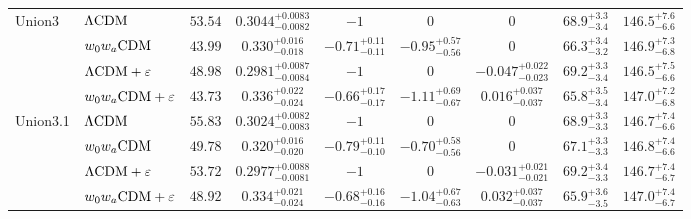\begin{table}[t]
\begin{ruledtabular}
\begin{tabular}{llrcccccc}
Union3 & $\Lambda{\rm CDM}$ & $53.54$ & $0.3044^{+0.0083}_{-0.0082}$ & $-1$ & $0$ & $0$ & $68.9^{+3.3}_{-3.4}$ & $146.5^{+7.6}_{-6.6}$ \\[0.4em]
 & $w_0w_a{\rm CDM}$ & $43.99$ & $0.330^{+0.016}_{-0.018}$ & $-0.71^{+0.11}_{-0.11}$ & $-0.95^{+0.57}_{-0.56}$ & $0$ & $66.3^{+3.4}_{-3.2}$ & $146.9^{+7.3}_{-6.8}$ \\[0.4em]
 & $\Lambda{\rm CDM} + \varepsilon$ & $48.98$ & $0.2981^{+0.0087}_{-0.0084}$ & $-1$ & $0$ & $-0.047^{+0.022}_{-0.023}$ & $69.2^{+3.3}_{-3.4}$ & $146.5^{+7.5}_{-6.6}$ \\[0.4em]
 & $w_0w_a{\rm CDM} + \varepsilon$ & $43.73$ & $0.336^{+0.022}_{-0.024}$ & $-0.66^{+0.17}_{-0.17}$ & $-1.11^{+0.69}_{-0.67}$ & $0.016^{+0.037}_{-0.037}$ & $65.8^{+3.5}_{-3.4}$ & $147.0^{+7.2}_{-6.8}$ \\[0.4em]
\hline\rule{0pt}{1.4em}%
Union3.1 & $\Lambda{\rm CDM}$ & $55.83$ & $0.3024^{+0.0082}_{-0.0083}$ & $-1$ & $0$ & $0$ & $68.9^{+3.3}_{-3.3}$ & $146.7^{+7.4}_{-6.6}$ \\[0.4em]
 & $w_0w_a{\rm CDM}$ & $49.78$ & $0.320^{+0.016}_{-0.020}$ & $-0.79^{+0.11}_{-0.10}$ & $-0.70^{+0.58}_{-0.56}$ & $0$ & $67.1^{+3.3}_{-3.3}$ & $146.8^{+7.4}_{-6.6}$ \\[0.4em]
 & $\Lambda{\rm CDM} + \varepsilon$ & $53.72$ & $0.2977^{+0.0088}_{-0.0081}$ & $-1$ & $0$ & $-0.031^{+0.021}_{-0.021}$ & $69.2^{+3.4}_{-3.3}$ & $146.7^{+7.4}_{-6.7}$ \\[0.4em]
 & $w_0w_a{\rm CDM} + \varepsilon$ & $48.92$ & $0.334^{+0.021}_{-0.024}$ & $-0.68^{+0.16}_{-0.16}$ & $-1.04^{+0.67}_{-0.63}$ & $0.032^{+0.037}_{-0.037}$ & $65.9^{+3.6}_{-3.5}$ & $147.0^{+7.4}_{-6.7}$ \\[0.4em]
\end{tabular}
\end{ruledtabular}
\end{table}

